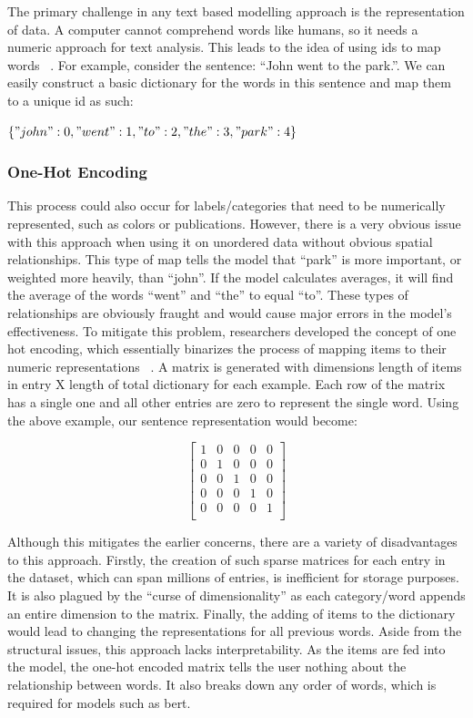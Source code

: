 The primary challenge in any text based modelling approach is the representation of data. A computer cannot comprehend words like humans, so it needs a numeric approach for text analysis. This leads to the idea of using ids to map words ~\parencite{nlpfundamentals}. For example, consider the sentence: “John went to the park.”. We can easily construct a basic dictionary for the words in this sentence and map them to a unique id as such: 

$\{"john" : 0, "went" : 1, "to" : 2, "the" : 3, "park" : 4\}$

\subsubsection{One-Hot Encoding}
This process could also occur for labels/categories that need to be numerically represented, such as colors or publications. However, there is a very obvious issue with this approach when using it on unordered data without obvious spatial relationships. This type of map tells the model that “park” is more important, or weighted more heavily, than “john”. If the model calculates averages, it will find the average of the words “went” and “the” to equal “to”. These types of relationships are obviously fraught and would cause major errors in the model’s effectiveness. To mitigate this problem, researchers developed the concept of one hot encoding, which essentially binarizes the process of mapping items to their numeric representations ~\parencite{harris_harris_2015}. A matrix is generated with dimensions length of items in entry X length of total dictionary for each example. Each row of the matrix has a single one and all other entries are zero to represent the single word. Using the above example, our sentence representation would become:

\[\begin{bmatrix}
1 & 0 & 0 & 0 & 0\\
0 & 1 & 0 & 0 & 0\\
0 & 0 & 1 & 0 & 0\\
0 & 0 & 0 & 1 & 0\\
0 & 0 & 0 & 0 & 1\\
\end{bmatrix}\]

Although this mitigates the earlier concerns, there are a variety of disadvantages to this approach. Firstly, the creation of such sparse matrices for each entry in the dataset, which can span millions of entries, is inefficient for storage purposes. It is also plagued by the “curse of dimensionality” as each category/word appends an entire dimension to the matrix. Finally, the adding of items to the dictionary would lead to changing the representations for all previous words. Aside from the structural issues, this approach lacks interpretability. As the items are fed into the model, the one-hot encoded matrix tells the user nothing about the relationship between words. It also breaks down any order of words, which is required for models such as \acrshort{bert}.

